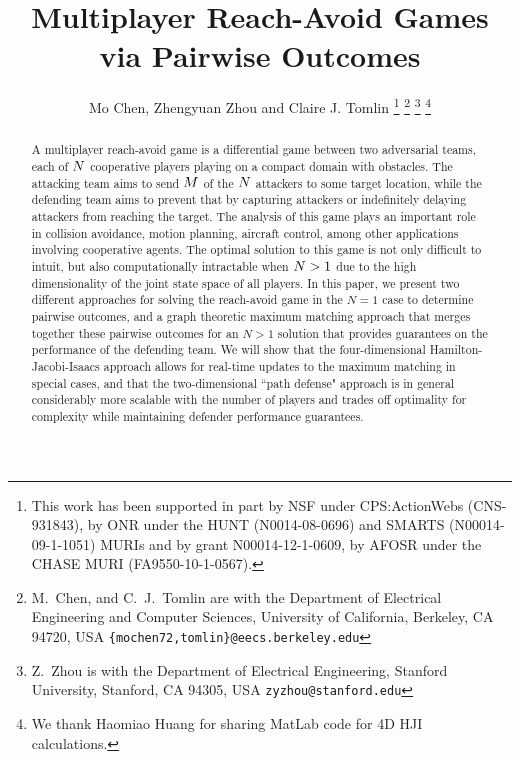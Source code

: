 \documentclass[journal]{IEEEtran}
\title{Multiplayer Reach-Avoid Games via Pairwise Outcomes}
\author{Mo Chen, Zhengyuan Zhou and Claire J. Tomlin%
\thanks{This work has been supported in part by NSF under CPS:ActionWebs (CNS-931843), by ONR under the HUNT (N0014-08-0696) and SMARTS (N00014-09-1-1051) MURIs and by grant N00014-12-1-0609, by AFOSR under the CHASE MURI (FA9550-10-1-0567).}%
\thanks{M.~Chen, and C.~J.~Tomlin are with the Department of Electrical Engineering and Computer Sciences,
        University of California, Berkeley, CA 94720, USA
        {\tt\small \{mochen72,tomlin\}@eecs.berkeley.edu}}
\thanks{Z.~Zhou is with the Department of Electrical Engineering,
        Stanford University, Stanford, CA 94305, USA
        {\tt\small zyzhou@stanford.edu}}   
\thanks{We thank Haomiao Huang for sharing MatLab code for 4D HJI calculations.}
}
\begin{document}
\maketitle
\thispagestyle{empty}
\pagestyle{empty}


\begin{abstract}
A multiplayer reach-avoid game is a differential game between two adversarial teams, each of $N$ cooperative players playing on a compact domain with obstacles. The attacking team aims to send $M$ of the $N$ attackers to some target location, while the defending team aims to prevent that by capturing attackers or indefinitely delaying attackers from reaching the target. The analysis of this game plays an important role in collision avoidance, motion planning, aircraft control, among other applications involving cooperative agents. The optimal solution to this game is not only difficult to intuit, but also computationally intractable when $N>1$ due to the high dimensionality of the joint state space of all players. In this paper, we present two different approaches for solving the reach-avoid game in the $N=1$ case to determine pairwise outcomes, and a graph theoretic maximum matching approach that merges together these pairwise outcomes for an $N>1$ solution that provides guarantees on the performance of the defending team. We will show that the four-dimensional Hamilton-Jacobi-Isaacs approach allows for real-time updates to the maximum matching in special cases, and that the two-dimensional ``path defense" approach is in general considerably more scalable with the number of players and trades off optimality for complexity while maintaining defender performance guarantees.
\end{abstract}

 

% 






\end{document}

